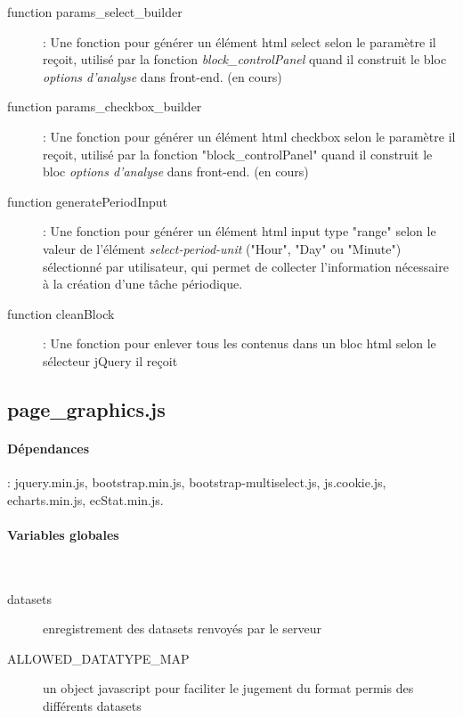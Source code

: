 \documentclass[a4paper]{report}
\begin{document}
\begin{description}
	\item[function params\_select\_builder]: Une fonction pour générer un élément html select selon le paramètre il reçoit, utilisé par la fonction \emph{block\_controlPanel} quand il construit le bloc \emph{options d'analyse} dans front-end. (en cours)
	
	\item[function params\_checkbox\_builder]: Une fonction pour générer un élément html checkbox selon le paramètre il reçoit, utilisé par la fonction "block\_controlPanel" quand il construit le bloc \emph{options d'analyse} dans front-end. (en cours)
	
	\item[function generatePeriodInput]: Une fonction pour générer un élément html input type "range" selon le valeur de l'élément \emph{select-period-unit} ("Hour", "Day" ou "Minute") sélectionné par utilisateur, qui permet de collecter l'information nécessaire à la création d'une tâche périodique. 
	
	\item[function cleanBlock]: Une fonction pour enlever tous les contenus dans un bloc html selon le sélecteur jQuery il reçoit
\end{description}

\subsection{page\_graphics.js}

\paragraph{Dépendances} : jquery.min.js, bootstrap.min.js, bootstrap-multiselect.js, js.cookie.js, echarts.min.js, ecStat.min.js.

\paragraph{Variables globales}~\\
\begin{description}
	\item[datasets] enregistrement des datasets renvoyés par le serveur
	\item[ALLOWED\_DATATYPE\_MAP] un object javascript pour faciliter le jugement du format permis des différents datasets
\end{description}
\end{document}
